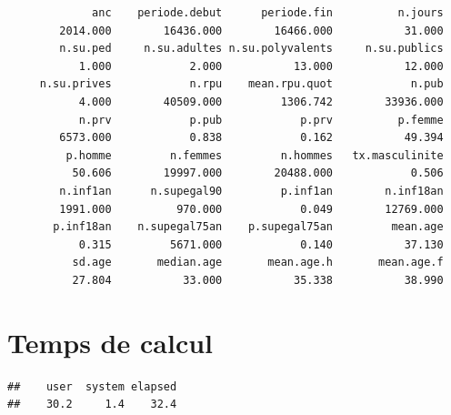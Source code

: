 \documentclass[]{article}
\begin{document}
\begin{verbatim}
             anc    periode.debut      periode.fin          n.jours 
        2014.000        16436.000        16466.000           31.000 
        n.su.ped     n.su.adultes n.su.polyvalents     n.su.publics 
           1.000            2.000           13.000           12.000 
     n.su.prives            n.rpu    mean.rpu.quot            n.pub 
           4.000        40509.000         1306.742        33936.000 
           n.prv            p.pub            p.prv          p.femme 
        6573.000            0.838            0.162           49.394 
         p.homme         n.femmes         n.hommes   tx.masculinite 
          50.606        19997.000        20488.000            0.506 
        n.inf1an      n.supegal90         p.inf1an        n.inf18an 
        1991.000          970.000            0.049        12769.000 
       p.inf18an    n.supegal75an    p.supegal75an         mean.age 
           0.315         5671.000            0.140           37.130 
          sd.age       median.age       mean.age.h       mean.age.f 
          27.804           33.000           35.338           38.990 
\end{verbatim}

\section{Temps de calcul}\label{temps-de-calcul}

\begin{verbatim}
##    user  system elapsed 
##    30.2     1.4    32.4
\end{verbatim}
\end{document}
